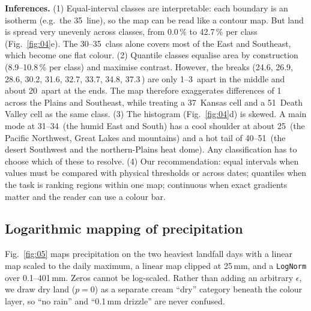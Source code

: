 \textbf{Inferences.}
(1) Equal-interval classes are interpretable: each boundary is an isotherm (e.g.\ the 35\,\degC{} line), so the map can be
read like a contour map. But land is spread very unevenly across classes, from 0.0\,\% to 42.7\,\% per class
(Fig.~\ref{fig:04}e). The 30--35\,\degC{} class alone covers most of the East and Southeast, which become one flat colour.
(2) Quantile classes equalise area by construction (8.9--10.8\,\% per class) and maximise contrast. However, the breaks
(24.6, 26.9, 28.6, 30.2, 31.6, 32.7, 33.7, 34.8, 37.3\,\degC) are only 1--3\,\degC{} apart in the middle and about
20\,\degC{} apart at the ends. The map therefore exaggerates differences of 1\,\degC{} across the Plains and Southeast, while
treating a 37\,\degC{} Kansas cell and a 51\,\degC{} Death Valley cell as the same class.
(3) The histogram (Fig.~\ref{fig:04}d) is skewed. A main mode at 31--34\,\degC{} (the humid East and South) has a cool
shoulder at about 25\,\degC{} (the Pacific Northwest, Great Lakes and mountains) and a hot tail of 40--51\,\degC{} (the
desert Southwest and the northern-Plains heat dome). Any classification has to choose which of these to resolve.
(4) Our recommendation: equal intervals when values must be compared with physical thresholds or across dates; quantiles
when the task is ranking regions within one map; continuous when exact gradients matter and the reader can use a colour
bar.

\subsection{Logarithmic mapping of precipitation}
Fig.~\ref{fig:05} maps precipitation on the two heaviest landfall days with a linear map scaled to the daily maximum, a
linear map clipped at 25\,mm, and a \texttt{LogNorm} over 0.1--401\,mm. Zeros cannot be log-scaled. Rather than adding an
arbitrary $\epsilon$, we draw dry land ($p=0$) as a separate cream ``dry'' category beneath the colour layer, so ``no
rain'' and ``0.1\,mm drizzle'' are never confused.


